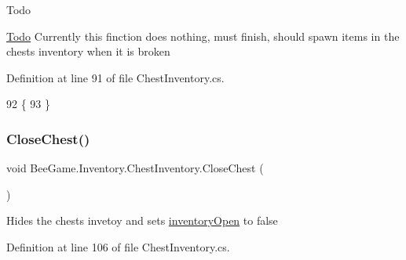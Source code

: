 \begin{DoxyRefDesc}{Todo}
\item[\hyperlink{todo__todo000005}{Todo}]Currently this finction does nothing, must finish, should spawn items in the chests inventory when it is broken \end{DoxyRefDesc}


Definition at line 91 of file Chest\+Inventory.\+cs.


\begin{DoxyCode}
92         \{
93         \}
\end{DoxyCode}
\mbox{\label{class_bee_game_1_1_inventory_1_1_chest_inventory_a0a42c60f89a1c79ce2be4f23da86e7b6}} 
\subsubsection{\texorpdfstring{Close\+Chest()}{CloseChest()}}
{\footnotesize\ttfamily void Bee\+Game.\+Inventory.\+Chest\+Inventory.\+Close\+Chest (\begin{DoxyParamCaption}{ }\end{DoxyParamCaption})}



Hides the chests invetoy and sets \hyperlink{class_bee_game_1_1_inventory_1_1_chest_inventory_a3e3529178934f2a4a8e91529c148457c}{inventory\+Open} to false 



Definition at line 106 of file Chest\+Inventory.\+cs.


